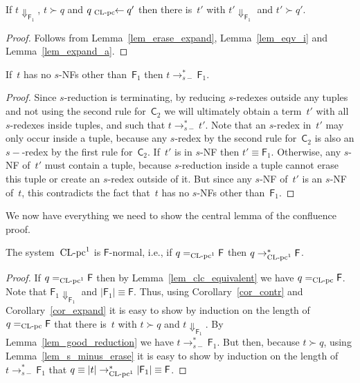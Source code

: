 \documentclass[a4paper,UKenglish]{lipics-v2016}
\newcommand{\Cs}{\mathsf{C}}
\newcommand{\Fs}{\mathsf{F}}
\newcommand{\from}{\ensuremath{\leftarrow}}
\newcommand{\Da}{\ensuremath{\Downarrow}}
\newcommand{\reduces}{\ensuremath{\to^*}}
\newcommand{\erase}[1]{\ensuremath{|#1|}}
\newcommand{\leftidx}[3]{{\;\vphantom{#2}}#1\!\!#2#3}
\newcommand{\sCLC}{{\ensuremath{\text{\rm CL-pc}^1}}}
\newcommand{\sCLCz}{\ensuremath{\text{\rm CL-pc}}}
\newcommand{\equiverased}{\succ}
\begin{document}
\begin{corollary}\label{cor_expand}
  If $t \Da_{\Fs_1}$, $t \equiverased q$ and
  $q \leftidx{{}_{\sCLCz}}{\from} q'$ then there is~$t'$ with
  $t' \Da_{\Fs_1}$ and $t' \equiverased q'$.
\end{corollary}

\begin{proof}
  Follows from Lemma~\ref{lem_erase_expand}, Lemma~\ref{lem_eqv_i} and
  Lemma~\ref{lem_expand_a}.
\end{proof}

\begin{lemma}\label{lem_good_reduction}
  If~$t$ has no $s$-NFs other than~$\Fs_1$ then
  $t \to_{s{-}}^{*} \Fs_1$.
\end{lemma}

\begin{proof}
  Since $s$-reduction is terminating, by reducing $s$-redexes outside
  any tuples and not using the second rule for~$\Cs_2$ we will
  ultimately obtain a term~$t'$ with all $s$-redexes inside tuples,
  and such that $t \to_{s{-}}^{*} t'$. Note that an $s$-redex in~$t'$
  may only occur inside a tuple, because any $s$-redex by the second
  rule for~$\Cs_2$ is also an $s{-}$-redex by the first rule
  for~$\Cs_2$. If~$t'$ is in $s$-NF then $t' \equiv \Fs_1$. Otherwise,
  any $s$-NF of~$t'$ must contain a tuple, because $s$-reduction
  inside a tuple cannot erase this tuple or create an $s$-redex
  outside of it. But since any $s$-NF of~$t'$ is an $s$-NF of~$t$,
  this contradicts the fact that~$t$ has no $s$-NFs other
  than~$\Fs_1$.
\end{proof}

We now have everything we need to show the central lemma of the
confluence proof.

\begin{lemma}\label{lem_f_nf}
  The system~$\sCLC$ is $\Fs$-normal, i.e., if $q =_\sCLC \Fs$ then
  $q \reduces_\sCLC \Fs$.
\end{lemma}

\begin{proof}
  If $q =_\sCLC \Fs$ then by Lemma~\ref{lem_clc_equivalent} we have
  $q =_{\sCLCz} \Fs$. Note that $\Fs_1 \Da_{\Fs_1}$ and
  $\erase{\Fs_1} \equiv \Fs$. Thus, using Corollary~\ref{cor_contr}
  and Corollary~\ref{cor_expand} it is easy to show by induction on
  the length of $q =_{\sCLCz} \Fs$ that there is~$t$ with
  $t \equiverased q$ and $t \Da_{\Fs_1}$. By
  Lemma~\ref{lem_good_reduction} we have $t \to_{s{-}}^{*} \Fs_1$. But
  then, because $t \equiverased q$, using
  Lemma~\ref{lem_s_minus_erase} it is easy to show by induction on the
  length of $t \to_{s{-}}^{*} \Fs_1$ that
  $q \equiv \erase{t} \reduces_\sCLC \erase{\Fs_1} \equiv \Fs$.
\end{proof}
\end{document}
